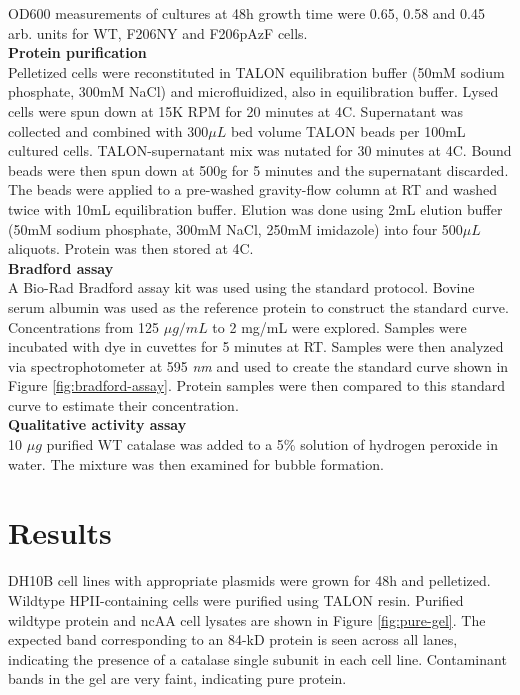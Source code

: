 \documentclass[journal=jacsat,manuscript=article]{achemso}
\begin{document}
OD600 measurements of cultures at 48h growth time were 0.65, 0.58 and 0.45 arb. units for WT, F206NY and F206pAzF cells.\\

\textbf{Protein purification}\\
Pelletized cells were reconstituted in TALON equilibration buffer (50mM sodium phosphate, 300mM NaCl) and microfluidized, also in equilibration buffer. Lysed cells were spun down at 15K RPM for 20 minutes at 4C. Supernatant was collected and combined with 300$\mu L$ bed volume TALON beads per 100mL cultured cells. TALON-supernatant mix was nutated for 30 minutes at 4C. Bound beads were then spun down at 500g for 5 minutes and the supernatant discarded. The beads were applied to a pre-washed gravity-flow column at RT and washed twice with 10mL equilibration buffer. Elution was done using 2mL elution buffer (50mM sodium phosphate, 300mM NaCl, 250mM imidazole) into four 500$\mu L$ aliquots. Protein was then stored at 4C.\\

\textbf{Bradford assay}\\
A Bio-Rad Bradford assay kit was used using the standard protocol. Bovine serum albumin was used as the reference protein to construct the standard curve. Concentrations from 125 $\mu g / mL$ to 2 mg/mL were explored. Samples were incubated with dye in cuvettes for 5 minutes at RT. Samples were then analyzed via spectrophotometer at 595 \textit{nm} and used to create the standard curve shown in Figure \ref{fig:bradford-assay}. Protein samples were then compared to this standard curve to estimate their concentration.\\

\textbf{Qualitative activity assay}\\
10 $\mu g$ purified WT catalase was added to a 5\% solution of hydrogen peroxide in water. The mixture was then examined for bubble formation.\\

\section{Results}
DH10B cell lines with appropriate plasmids were grown for 48h and pelletized. Wildtype HPII-containing cells were purified using TALON resin. Purified wildtype protein and ncAA cell lysates are shown in Figure \ref{fig:pure-gel}. The expected band corresponding to an 84-kD protein is seen across all lanes, indicating the presence of a catalase single subunit in each cell line. Contaminant bands in the gel are very faint, indicating pure protein.\\
\end{document}
